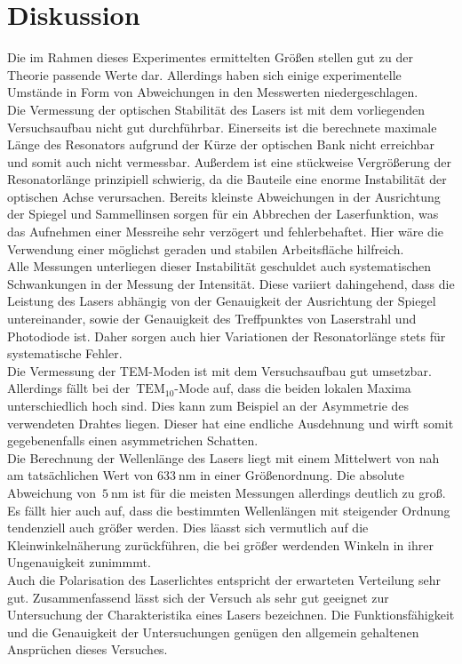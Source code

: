 \section{Diskussion}
\label{sec:diskussion}
%
Die im Rahmen dieses Experimentes ermittelten Größen stellen gut zu der Theorie
passende Werte dar. Allerdings haben sich einige experimentelle Umstände in Form
von Abweichungen in den Messwerten niedergeschlagen. \\
Die Vermessung der optischen Stabilität des Lasers ist mit dem vorliegenden
Versuchsaufbau nicht gut durchführbar. Einerseits ist die berechnete maximale
Länge des Resonators aufgrund der Kürze der optischen Bank nicht erreichbar und
somit auch nicht vermessbar. Außerdem ist eine stückweise Vergrößerung der
Resonatorlänge prinzipiell schwierig, da die Bauteile eine enorme Instabilität
der optischen Achse verursachen. Bereits kleinste Abweichungen in der
Ausrichtung der Spiegel und Sammellinsen sorgen für ein Abbrechen der Laserfunktion,
was das Aufnehmen einer Messreihe sehr verzögert und fehlerbehaftet. Hier wäre
die Verwendung einer möglichst geraden und stabilen Arbeitsfläche hilfreich. \\
Alle Messungen unterliegen dieser Instabilität geschuldet auch systematischen
Schwankungen in der Messung der Intensität. Diese variiert dahingehend, dass
die Leistung des Lasers abhängig von der Genauigkeit der Ausrichtung der Spiegel
untereinander, sowie der Genauigkeit des Treffpunktes von Laserstrahl und
Photodiode ist. Daher sorgen auch hier Variationen der Resonatorlänge stets für
systematische Fehler. \\
Die Vermessung der TEM-Moden ist mit dem Versuchsaufbau gut umsetzbar.
Allerdings fällt bei der~$\text{TEM}_{10}$-Mode auf, dass die beiden lokalen
Maxima unterschiedlich hoch sind. Dies kann zum Beispiel an der Asymmetrie
des verwendeten Drahtes liegen. Dieser hat eine endliche Ausdehnung und wirft somit
gegebenenfalls einen asymmetrichen Schatten. \\
Die Berechnung der Wellenlänge des Lasers liegt mit einem Mittelwert von nah am
tatsächlichen Wert von $\SI{633}{\nano\meter}$ \cite{laser} in einer Größenordnung.
Die absolute Abweichung von~$\SI{5}{\nano\meter}$ ist für die meisten Messungen
allerdings deutlich zu groß. Es fällt hier auch auf, dass die bestimmten Wellenlängen
mit steigender Ordnung tendenziell auch größer werden. Dies läasst sich vermutlich
auf die Kleinwinkelnäherung zurückführen, die bei größer werdenden Winkeln in ihrer
Ungenauigkeit zunimmmt. \\
Auch die Polarisation des Laserlichtes entspricht der erwarteten Verteilung sehr
gut. Zusammenfassend lässt sich der Versuch als sehr gut geeignet zur
Untersuchung der Charakteristika eines Lasers bezeichnen. Die Funktionsfähigkeit
und die Genauigkeit der Untersuchungen genügen den allgemein gehaltenen
Ansprüchen dieses Versuches.
\nocite{V61}
